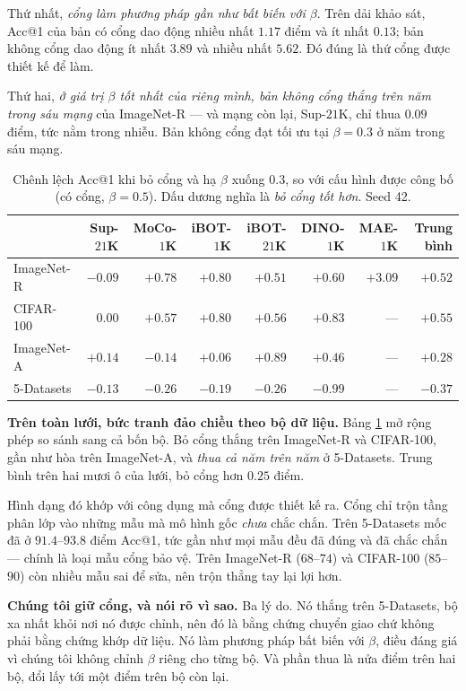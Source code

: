 \documentclass[11pt,a4paper]{article}
\begin{document}
Thứ nhất, \emph{cổng làm phương pháp gần như bất biến với $\beta$}. Trên dải
khảo sát, Acc@1 của bản có cổng dao động nhiều nhất $1.17$ điểm và ít nhất
$0.13$; bản không cổng dao động ít nhất $3.89$ và nhiều nhất $5.62$. Đó đúng là
thứ cổng được thiết kế để làm.

Thứ hai, \emph{ở giá trị $\beta$ tốt nhất của riêng mình, bản không cổng thắng
trên năm trong sáu mạng} của ImageNet-R --- và mạng còn lại, Sup-$21$K, chỉ thua
$0.09$ điểm, tức nằm trong nhiễu. Bản không cổng đạt tối ưu tại $\beta = 0.3$ ở
năm trong sáu mạng.

\begin{table}[htbp]
\centering
\small
\caption{Chênh lệch Acc@1 khi bỏ cổng và hạ $\beta$ xuống $0.3$, so với cấu hình
được công bố (có cổng, $\beta = 0.5$). Dấu dương nghĩa là \emph{bỏ cổng tốt
hơn}. Seed 42.}
\label{tab:gate-cross}
\begin{tabular}{@{}lrrrrrrr@{}}
\toprule
& Sup-$21$K & MoCo-$1$K & iBOT-$1$K & iBOT-$21$K & DINO-$1$K & MAE-$1$K
  & Trung bình \\
\midrule
ImageNet-R & $-0.09$ & $+0.78$ & $+0.80$ & $+0.51$ & $+0.60$ & $+3.09$ & $+0.52$ \\
CIFAR-100  & $\ \ 0.00$ & $+0.57$ & $+0.80$ & $+0.56$ & $+0.83$ & --- & $+0.55$ \\
ImageNet-A & $+0.14$ & $-0.14$ & $+0.06$ & $+0.89$ & $+0.46$ & --- & $+0.28$ \\
5-Datasets & $-0.13$ & $-0.26$ & $-0.19$ & $-0.26$ & $-0.99$ & --- & $-0.37$ \\
\bottomrule
\end{tabular}
\end{table}

\textbf{Trên toàn lưới, bức tranh đảo chiều theo bộ dữ liệu.} Bảng
\ref{tab:gate-cross} mở rộng phép so sánh sang cả bốn bộ. Bỏ cổng thắng trên
ImageNet-R và CIFAR-100, gần như hòa trên ImageNet-A, và \emph{thua cả năm trên
năm} ở 5-Datasets. Trung bình trên hai mươi ô của lưới, bỏ cổng hơn $0.25$ điểm.

Hình dạng đó khớp với công dụng mà cổng được thiết kế ra. Cổng chỉ trộn tầng
phân lớp vào những mẫu mà mô hình gốc \emph{chưa} chắc chắn. Trên 5-Datasets mốc
đã ở $91.4$--$93.8$ điểm Acc@1, tức gần như mọi mẫu đều đã đúng và đã chắc chắn
--- chính là loại mẫu cổng bảo vệ. Trên ImageNet-R ($68$--$74$) và CIFAR-100
($85$--$90$) còn nhiều mẫu sai để sửa, nên trộn thẳng tay lại lợi hơn.

\textbf{Chúng tôi giữ cổng, và nói rõ vì sao.} Ba lý do. Nó thắng trên
5-Datasets, bộ xa nhất khỏi nơi nó được chỉnh, nên đó là bằng chứng chuyển giao
chứ không phải bằng chứng khớp dữ liệu. Nó làm phương pháp bất biến với $\beta$,
điều đáng giá vì chúng tôi không chỉnh $\beta$ riêng cho từng bộ. Và phần thua
là nửa điểm trên hai bộ, đổi lấy tới một điểm trên bộ còn lại.
\end{document}
